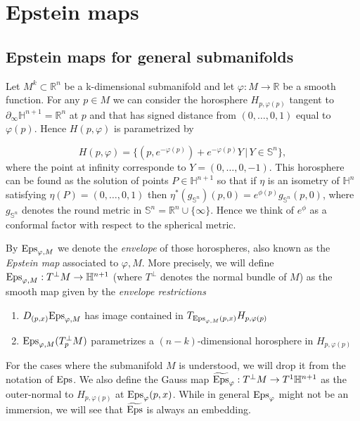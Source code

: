 \documentclass[12pt]{amsart}
\newcommand{\HH}{\mathbb{H}}
\newcommand{\RR}{\mathbb{R}}
\newcommand{\Eps}{{\rm Eps}}
\begin{document}
\section{Epstein maps}\label{sec:Epsteinsurfaces}

\subsection{Epstein maps for general submanifolds}\label{subsecGeneralEps}

Let $M^k \subset \mathbb{R}^{n}$ be a k-dimensional submanifold and let $\varphi: M\rightarrow \RR$ be a smooth function. For any $p\in M$ we can consider the horosphere $H_{p, \varphi(p)}$ tangent to $\partial_{\infty}\HH^{n+1} = \mathbb{R}^{n}$ at $p$ and that has signed distance from $(0,\ldots,0,1)$ equal to $\varphi(p)$. Hence $H(p,\varphi)$ is parametrized by 

\[H(p,\varphi) = \big\lbrace (p,e^{-\varphi(p)}) + e^{-\varphi(p)}Y \,\big|\, Y\in \mathbb{S}^n \big\rbrace,
\]
where the point at infinity corresponde to $Y=(0,\ldots,0,-1)$. This horosphere can be found as the solution of points $P\in\mathbb{H}^{n+1}$ so that if $\eta$ is an isometry of $\mathbb{H}^n$ satisfying $\eta(P)=(0,\ldots,0,1)$ then $\eta^*(g_{\mathbb{S}^{n}})(p,0) = e^{\phi(p)}g_{\mathbb{S}^{n}}(p,0)$, where $g_{\mathbb{S}^n}$ denotes the round metric in $\mathbb{S}^n=\RR^{n}\cup\lbrace\infty\rbrace$. Hence we think of $e^\phi$ as a conformal factor with respect to the spherical metric. 

By $\Eps_{\varphi,M}$ we denote the \emph{envelope} of those horospheres, also known as the \emph{Epstein map} associated to $\varphi, M$. More precisely, we will define $\Eps_{\varphi,M}:T^\perp M \rightarrow \HH^{n+1}$ (where $T^\perp$ denotes the normal bundle of $M$) as the smooth map given by the \emph{envelope restrictions}

\begin{enumerate}
    \item\label{item:tangency} $D_{(p,x)}\Eps_{\varphi,M}$ has image contained in $T_{\Eps_{\varphi,M}(p,x)}H_{p,\varphi(p)}$
    \item\label{item:horosphere} $\Eps_{\varphi,M}(T^\perp_pM)$ parametrizes a $(n-k)$-dimensional horosphere in $H_{p,\varphi(p)}$
\end{enumerate}
For the cases where the submanifold $M$ is understood, we will drop it from the notation of $\Eps$. We also define the Gauss map $\widetilde{\Eps}_{\varphi}:T^\perp M \rightarrow T^1\HH^{n+1}$ as the outer-normal to $H_{p,\varphi(p)}$ at $\Eps_{\varphi}(p,x)$. While in general $\Eps_\varphi$ might not be an immersion, we will see that $\widetilde{\Eps}$ is always an embedding.
\end{document}
